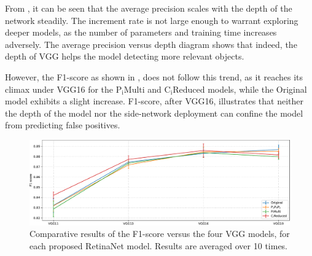 From , it can be seen that the average precision scales with the depth of the network steadily. The increment rate is not large enough to warrant exploring deeper models, as the number of parameters and training time increases adversely. The average precision versus depth diagram shows that indeed, the depth of VGG helps the model detecting more relevant objects.

However, the F1-score as shown in , does not follow this trend, as it reaches its climax under VGG16 for the $\text{P}_\text{i}\text{Multi}$ and $\text{C}_\text{i}\text{Reduced}$ models, while the Original model exhibits a slight increase.
F1-score, after VGG16, illustrates that neither the depth of the model nor the side-network deployment can confine the model from predicting false positives.

\begin{figure}[!htb]
  \centering
  \includegraphics[width=\textwidth]{figures/ch5/fig2.pdf}
  \caption{Comparative results of the F1-score versus the four VGG models, for each proposed RetinaNet model. Results are averaged over 10 times.}
  \label{ch5:fig2}
\end{figure}

\begin{table}[!htb]
  \centering
  \caption{Indicative values of F1-score for the selected four VGG models, for each proposed RetinaNet model (). Parentheses indicate the input resolution.}
  \label{ch5:tab2}
\end{table}

